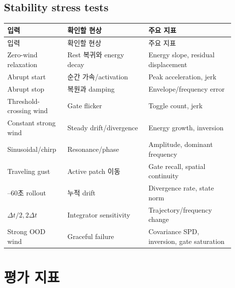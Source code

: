 \documentclass[11pt,a4paper]{article}
\begin{document}
\subsection{Stability stress tests}

\begin{longtable}{L{0.24\linewidth}L{0.33\linewidth}L{0.35\linewidth}}
\toprule
입력 & 확인할 현상 & 주요 지표 \\
\midrule
\endfirsthead
\toprule
입력 & 확인할 현상 & 주요 지표 \\
\midrule
\endhead
Zero-wind relaxation & Rest 복귀와 energy decay & Energy slope, residual displacement \\
\addlinespace
Abrupt start & 순간 가속/activation & Peak acceleration, jerk \\
\addlinespace
Abrupt stop & 복원과 damping & Envelope/frequency error \\
\addlinespace
Threshold-crossing wind & Gate flicker & Toggle count, jerk \\
\addlinespace
Constant strong wind & Steady drift/divergence & Energy growth, inversion \\
\addlinespace
Sinusoidal/chirp & Resonance/phase & Amplitude, dominant frequency \\
\addlinespace
Traveling gust & Active patch 이동 & Gate recall, spatial continuity \\
--60초 rollout & 누적 drift & Divergence rate, state norm \\
\addlinespace
\(\Delta t/2,2\Delta t\) & Integrator sensitivity & Trajectory/frequency change \\
\addlinespace
Strong OOD wind & Graceful failure & Covariance SPD, inversion, gate saturation \\
\bottomrule
\end{longtable}

\section{평가 지표}
\end{document}
